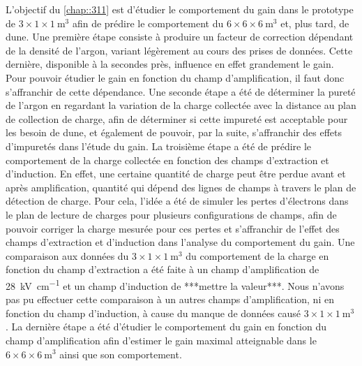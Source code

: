 L'objectif du \autoref{chap::311} est d'étudier le comportement du gain dans le prototype de $3\times1\times\SI{1}{\meter^3}$ afin de prédire le comportement du $6\times6\times\SI{6}{\meter^3}$ et, plus tard, de \gls{dune}. Une première étape consiste à produire un facteur de correction dépendant de la densité de l'argon, variant légèrement au cours des prises de données. Cette dernière, disponible à la secondes près, influence en effet grandement le gain. Pour pouvoir étudier le gain en fonction du champ d'amplification, il faut donc s'affranchir de cette dépendance. Une seconde étape a été de déterminer la pureté de l'argon en regardant la variation de la charge collectée avec la distance au plan de collection de charge, afin de déterminer si cette impureté est acceptable pour les besoin de \gls{dune}, et également de pouvoir, par la suite, s'affranchir des effets d'impuretés dans l'étude du gain. La troisième étape a été de prédire le comportement de la charge collectée en fonction des champs d'extraction et d'induction. En effet, une certaine quantité de charge peut être perdue avant et après amplification, quantité qui dépend des lignes de champs à travers le plan de détection de charge. Pour cela, l'idée a été de simuler les pertes d'électrons dans le plan de lecture de charges pour plusieurs configurations de champs, afin de pouvoir corriger la charge mesurée pour ces pertes et s'affranchir de l'effet des champs d'extraction et d'induction dans l'analyse du comportement du gain. Une comparaison aux données du $3\times1\times\SI{1}{\meter^3}$ du comportement de la charge en fonction du champ d'extraction a été faite à un champ d'amplification de  \SI{28}{\kilo\volt\per\centi\meter} et un champ d'induction de ***mettre la valeur***. Nous n'avons pas pu effectuer cette comparaison à un autres champs d'amplification, ni en fonction du champ d'induction, à cause du manque de données causé $3\times1\times\SI{1}{\meter^3}$. La dernière étape a été d'étudier le comportement du gain en fonction du champ d'amplification afin d'estimer le gain maximal atteignable dans le $6\times6\times\SI{6}{\meter^3}$ ainsi que son comportement.


